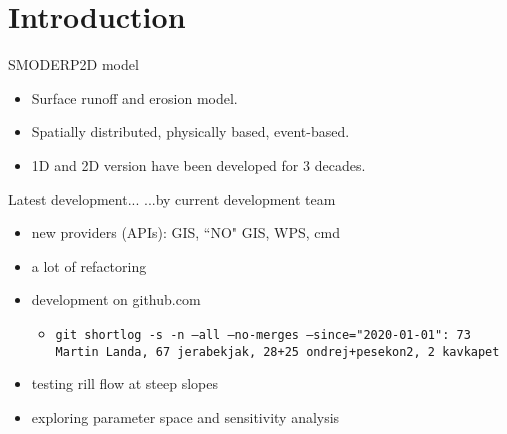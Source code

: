 \section{Introduction}

\begin{frame}{SMODERP2D model}
   \begin{itemize}
       \item Surface runoff and erosion model.
       \item Spatially distributed, physically based, event-based.
       \item 1D and 2D version have been developed for 3 decades.
   \end{itemize}
\pause

   \begin{block}{Latest development...}
   ...by current development team
   \begin{itemize}
       \item new providers (APIs): GIS, ``NO" GIS, WPS, cmd
       \item a lot of refactoring
       \item development on github.com
       \begin{itemize}
           \item \texttt{git shortlog -s -n --all --no-merges --since="2020-01-01": 73  Martin Landa,  67  jerabekjak, 28+25  ondrej+pesekon2, 2  kavkapet}
       \end{itemize}
       \item testing rill flow at steep slopes
       \item exploring parameter space and sensitivity analysis
   \end{itemize}
   \end{block}

\end{frame}



